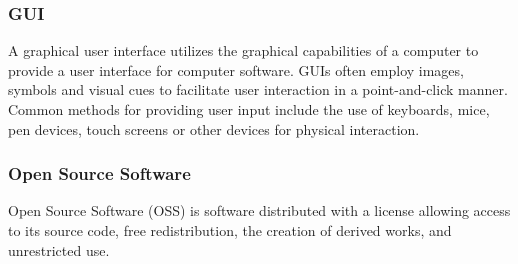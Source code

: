 \subsubsection*{GUI}

A graphical user interface utilizes the graphical capabilities of a computer to provide a
user interface for computer software. GUIs often employ images, symbols and visual cues
to facilitate user interaction in a point-and-click manner. Common methods for providing
user input include the use of keyboards, mice, pen devices, touch screens or other devices
for physical interaction.

\subsubsection*{Open Source Software}

Open Source Software (OSS) is software distributed with a license allowing access to its
source code, free redistribution, the creation of derived works, and unrestricted use.
